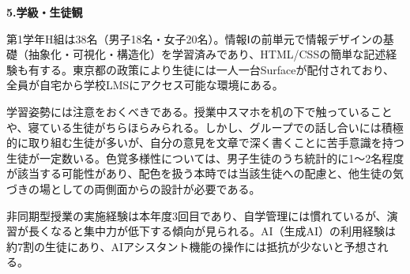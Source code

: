 \documentclass[uplatex,a4paper,11pt]{jsarticle}
\newcommand{\itemhead}[2]{\par\medskip\noindent\textbf{#1.\quad #2}\par\nopagebreak\smallskip}
\begin{document}
\itemhead{5}{学級・生徒観}
\hspace{1zw}第1学年H組は38名（男子18名・女子20名）。情報Ⅰの前単元で情報デザインの基礎（抽象化・可視化・構造化）を学習済みであり、HTML/CSSの簡単な記述経験も有する。東京都の政策により生徒には一人一台Surfaceが配付されており、全員が自宅から学校LMSにアクセス可能な環境にある。\par
\hspace{1zw}学習姿勢には注意をおくべきである。授業中スマホを机の下で触っていることや、寝ている生徒がちらほらみられる。しかし、グループでの話し合いには積極的に取り組む生徒が多いが、自分の意見を文章で深く書くことに苦手意識を持つ生徒が一定数いる。色覚多様性については、男子生徒のうち統計的に1〜2名程度が該当する可能性があり、配色を扱う本時では当該生徒への配慮と、他生徒の気づきの場としての両側面からの設計が必要である。\par
\hspace{1zw}非同期型授業の実施経験は本年度3回目であり、自学管理には慣れているが、演習が長くなると集中力が低下する傾向が見られる。AI（生成AI）の利用経験は約7割の生徒にあり、AIアシスタント機能の操作には抵抗が少ないと予想される。\par
\end{document}
